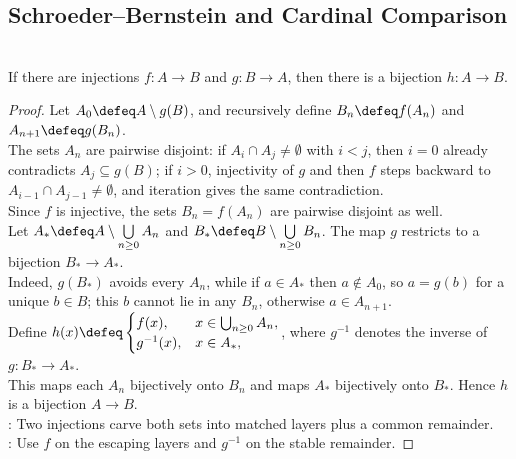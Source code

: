 \subsection{Schroeder--Bernstein and Cardinal Comparison}

\begin{theorem} \label{thm:schroeder-bernstein} \\
If there are injections $f:A\to B$ and $g:B\to A$, then there is a bijection $h:A\to B$.
\begin{proof}
Let $A_0\defeq A\setminus g(B)$, and recursively define $B_n\defeq f(A_n)$ and $A_{n+1}\defeq g(B_n)$.\\
The sets $A_n$ are pairwise disjoint: if $A_i\cap A_j\neq\emptyset$ with $i<j$, then $i=0$ already contradicts $A_j\subseteq g(B)$; if $i>0$, injectivity of $g$ and then $f$ steps backward to $A_{i-1}\cap A_{j-1}\neq\emptyset$, and iteration gives the same contradiction.\\
Since $f$ is injective, the sets $B_n=f(A_n)$ are pairwise disjoint as well.\\
Let $A_*\defeq A\setminus\bigcup\limits_{n\geq0}A_n$ and $B_*\defeq B\setminus\bigcup\limits_{n\geq0}B_n$. The map $g$ restricts to a bijection $B_*\to A_*$.\\
Indeed, $g(B_*)$ avoids every $A_n$, while if $a\in A_*$ then $a\notin A_0$, so $a=g(b)$ for a unique $b\in B$; this $b$ cannot lie in any $B_n$, otherwise $a\in A_{n+1}$.\\
Define $h(x)\defeq
\begin{cases}
f(x), & x\in\bigcup_{n\geq0}A_n,\\
g^{-1}(x), & x\in A_*,
\end{cases}$, where $g^{-1}$ denotes the inverse of $g:B_*\to A_*$.\\
This maps each $A_n$ bijectively onto $B_n$ and maps $A_*$ bijectively onto $B_*$. Hence $h$ is a bijection $A\to B$.\\
: Two injections carve both sets into matched layers plus a common remainder.\\
: Use $f$ on the escaping layers and $g^{-1}$ on the stable remainder.
\end{proof}
\end{theorem}

